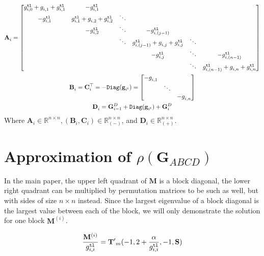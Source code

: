 \documentclass[journal,onecolumn]{IEEEtran}
\newcommand{\vtt}[1]{%
  \text{\normalfont\ttfamily\detokenize{#1}}%
}
\begin{document}
    \begin{gather*}
        \mathbf{A}^{}_i = \begin{bmatrix}
            g^\vtt{tl}_{i,0} + g^{}_{i,1} + g^\vtt{tl}_{i,1} & -g^\vtt{tl}_{i,1} \\
            -g^\vtt{tl}_{i,1} & g^\vtt{tl}_{i,1} + g^{}_{i,2} + g^\vtt{tl}_{i,2} & \ddots \\
            & -g^\vtt{tl}_{i,2} & \ddots & -g^\vtt{tl}_{i,(j-1)} \\
            & & \ddots & g^\vtt{tl}_{i,(j-1)} + g^{}_{i,j}+g^\vtt{tl}_{i,j} & \ddots \\
            & & & -g^\vtt{tl}_{i,j} & \ddots & -g^\vtt{tl}_{i,(n-1)} \\
            & & & & \ddots & g^\vtt{tl}_{i,(n-1)} + g^{}_{i,n} + g^\vtt{tl}_{i,n} \\
        \end{bmatrix} \\
        \mathbf{B}^{}_i = \mathbf{C}^\top_i = -\vtt{Diag}(\mathbf{g}^{}_{i^t}) = 
        \begin{bmatrix}
            -g^{}_{i,1} \\ & \ddots \\ & & -g^{}_{i,n}
        \end{bmatrix} \\
        \mathbf{D}^{}_i = \mathbf{G}^{D}_{i-1} + \vtt{Diag}(\mathbf{g}^{}_{i^t}) + \mathbf{G}^{D}_i
    \end{gather*} Where $\mathbf{A}^{}_i \in \mathbb{R}^{n \times n}, (\mathbf{B}^{}_i, \mathbf{C}^{}_i) \in \mathbb{R}^{n \times n}_{(-)}$, and $\mathbf{D}^{}_i \in \mathbb{R}^{n \times n}_{(+)}$. \\ %

\newpage
\section{Approximation of $\rho(\mathbf{G}_{ABCD})$}
In the main paper, the upper left quadrant of $\mathbf{M}$ is a block diagonal, the lower right quadrant can be multiplied by permutation matrices to be such as well, but with sides of size $n \times n$ instead. Since the largest eigenvalue of a block diagonal is the largest value between each of the block, we will only demonstrate the solution for one block $\mathbf{M}^{(i)}$.

\begin{equation}
\frac{\mathbf{M}^{(i)}}{g^\vtt{tl}_{i,i}} = \mathbf{T'}_m(-1,2 + \frac{\alpha}{g^\vtt{tl}_{i,i}},-1,\mathbf{S})
\label{eq:m}
\end{equation}
\end{document}
